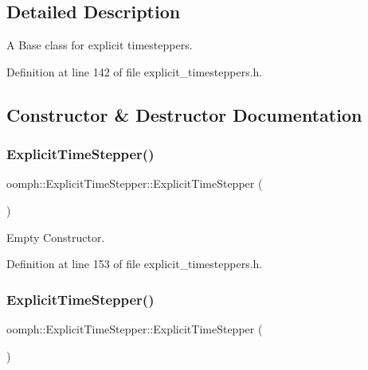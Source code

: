 \subsection{Detailed Description}
A Base class for explicit timesteppers. 

Definition at line 142 of file explicit\+\_\+timesteppers.\+h.



\subsection{Constructor \& Destructor Documentation}
\mbox{\label{classoomph_1_1ExplicitTimeStepper_a4b54826f4098eae55da1ee7fd51b634d}} 
\subsubsection{\texorpdfstring{Explicit\+Time\+Stepper()}{ExplicitTimeStepper()}\hspace{0.1cm}{\footnotesize\ttfamily [1/2]}}
{\footnotesize\ttfamily oomph\+::\+Explicit\+Time\+Stepper\+::\+Explicit\+Time\+Stepper (\begin{DoxyParamCaption}{ }\end{DoxyParamCaption})\hspace{0.3cm}{\ttfamily [inline]}}



Empty Constructor. 



Definition at line 153 of file explicit\+\_\+timesteppers.\+h.

\mbox{\label{classoomph_1_1ExplicitTimeStepper_ab2c6e0a9f8e620f7b3847ad46d297ad2}} 
\subsubsection{\texorpdfstring{Explicit\+Time\+Stepper()}{ExplicitTimeStepper()}\hspace{0.1cm}{\footnotesize\ttfamily [2/2]}}
{\footnotesize\ttfamily oomph\+::\+Explicit\+Time\+Stepper\+::\+Explicit\+Time\+Stepper (\begin{DoxyParamCaption}\item[{const \hyperlink{classoomph_1_1ExplicitTimeStepper}{Explicit\+Time\+Stepper} \&}]{ }\end{DoxyParamCaption})\hspace{0.3cm}{\ttfamily [inline]}}



